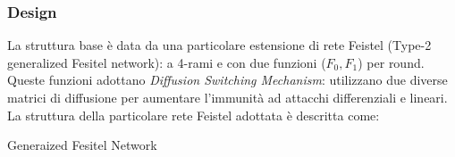 \documentclass[target=bach,aauheader=,style=]{thud}
\begin{document}
			\subsubsection{Design}
			La struttura base è data da una particolare estensione di rete Feistel (Type-2 generalized Fesitel network): a 4-rami e con due funzioni ($F_0, F_1$) per round. Queste funzioni adottano \textit{Diffusion Switching Mechanism}\cite{clefiadsm}: utilizzano due diverse matrici di diffusione per aumentare l'immunità ad attacchi differenziali e lineari.\\
			La struttura della particolare rete Feistel adottata è descritta come:\\
			\begin{algorithm}[htbp]
				\caption{Generaized Fesitel Network}
				\begin{algorithmic}
						\EndFor
					\EndProcedure
				\end{algorithmic}
			\end{algorithm}
			
\end{document}
